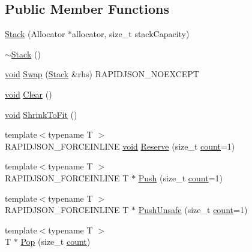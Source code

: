 \subsection*{Public Member Functions}
\begin{DoxyCompactItemize}
\item 
\hyperlink{classinternal_1_1Stack_af09ab91f9e5143deccf7c9af837f451e}{Stack} (Allocator $\ast$allocator, size\+\_\+t stack\+Capacity)
\item 
\hyperlink{classinternal_1_1Stack_afedce84c8816abe9277a71ebd5e1808a}{$\sim$\+Stack} ()
\item 
\hyperlink{imgui__impl__opengl3__loader_8h_ac668e7cffd9e2e9cfee428b9b2f34fa7}{void} \hyperlink{classinternal_1_1Stack_a5e601199a21d84b1ac612f558be0f2c3}{Swap} (\hyperlink{classinternal_1_1Stack}{Stack} \&rhs) R\+A\+P\+I\+D\+J\+S\+O\+N\+\_\+\+N\+O\+E\+X\+C\+E\+PT
\item 
\hyperlink{imgui__impl__opengl3__loader_8h_ac668e7cffd9e2e9cfee428b9b2f34fa7}{void} \hyperlink{classinternal_1_1Stack_a02da31665a372738e81ded2f7b7d598e}{Clear} ()
\item 
\hyperlink{imgui__impl__opengl3__loader_8h_ac668e7cffd9e2e9cfee428b9b2f34fa7}{void} \hyperlink{classinternal_1_1Stack_a3852b8494d69c91f6a238a51572e591e}{Shrink\+To\+Fit} ()
\item 
{\footnotesize template$<$typename T $>$ }\\R\+A\+P\+I\+D\+J\+S\+O\+N\+\_\+\+F\+O\+R\+C\+E\+I\+N\+L\+I\+NE \hyperlink{imgui__impl__opengl3__loader_8h_ac668e7cffd9e2e9cfee428b9b2f34fa7}{void} \hyperlink{classinternal_1_1Stack_a7ae5de892834b7fc16099eb5e23dd97c}{Reserve} (size\+\_\+t \hyperlink{imgui__impl__opengl3__loader_8h_a619bc20e8198de3bd3f3d7fc34de66b2}{count}=1)
\item 
{\footnotesize template$<$typename T $>$ }\\R\+A\+P\+I\+D\+J\+S\+O\+N\+\_\+\+F\+O\+R\+C\+E\+I\+N\+L\+I\+NE T $\ast$ \hyperlink{classinternal_1_1Stack_a8038223ec0ed6ea92bb5f48e645a25ca}{Push} (size\+\_\+t \hyperlink{imgui__impl__opengl3__loader_8h_a619bc20e8198de3bd3f3d7fc34de66b2}{count}=1)
\item 
{\footnotesize template$<$typename T $>$ }\\R\+A\+P\+I\+D\+J\+S\+O\+N\+\_\+\+F\+O\+R\+C\+E\+I\+N\+L\+I\+NE T $\ast$ \hyperlink{classinternal_1_1Stack_a63b4eabd209d4fc9b43027f4e5660532}{Push\+Unsafe} (size\+\_\+t \hyperlink{imgui__impl__opengl3__loader_8h_a619bc20e8198de3bd3f3d7fc34de66b2}{count}=1)
\item 
{\footnotesize template$<$typename T $>$ }\\T $\ast$ \hyperlink{classinternal_1_1Stack_a8545a8ccba595ac6e4ade9784474aa1c}{Pop} (size\+\_\+t \hyperlink{imgui__impl__opengl3__loader_8h_a619bc20e8198de3bd3f3d7fc34de66b2}{count})

\end{DoxyCompactItemize}
